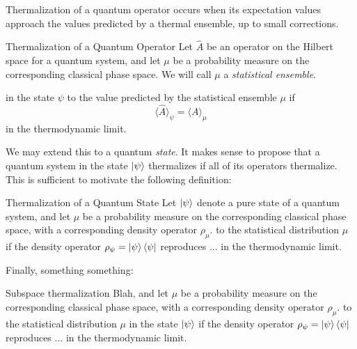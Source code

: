 Thermalization of a quantum operator occurs when its expectation values approach the values predicted by a thermal ensemble, up to small corrections.

\begin{definition}{Thermalization of a Quantum Operator}{}
    Let \(\hat{A}\) be an operator on the Hilbert space for a quantum system, and let \(\mu\) be a probability measure on the corresponding classical phase space.
    We will call \(\mu\) a \textit{statistical ensemble}.
    
     in the state \(\psi\) to the value predicted by the statistical ensemble \(\mu\) if
    \begin{equation}
        \langle \hat{A} \rangle_\psi = \langle A \rangle_\mu
    \end{equation}
    in the thermodynamic limit.
\end{definition}

We may extend this to a quantum \textit{state}.
%
It makes sense to propose that a quantum system in the state \(\ket{\psi}\) thermalizes if all of its operators thermalize.
%
This is sufficient to motivate the following definition:
\begin{definition}{Thermalization of a Quantum State}{}
    Let \(\ket{\psi}\) denote a pure state of a quantum system, and let \(\mu\) be a probability measure on the corresponding classical phase space, with a corresponding density operator \(\rho_\mu\).
     to the statistical distribution \(\mu\) if the density operator \(\rho_\psi = \ket{\psi}\bra{\psi}\) reproduces 
    ...
    in the thermodynamic limit.
\end{definition}


Finally, something something:
\begin{definition}{Subspace thermalization}{}
    Blah, and let \(\mu\) be a probability measure on the corresponding classical phase space, with a corresponding density operator \(\rho_\mu\).
     to the statistical distribution \(\mu\) in the state \(\ket{\psi}\) if the density operator \(\rho_\psi = \ket{\psi}\bra{\psi}\) reproduces 
    ...
    in the thermodynamic limit.
\end{definition}